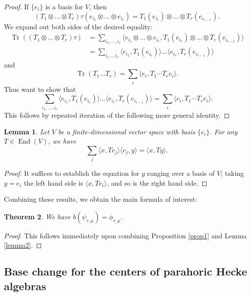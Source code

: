 \documentclass[reqno]{amsart}
\numberwithin{equation}{section}
\DeclareMathOperator{\Tr}{Tr}
\DeclareMathOperator{\End}{End}
\newtheorem{thm}{Theorem}[section]
\newtheorem{lemma}[thm]{Lemma}
\theoremstyle{remark}
\numberwithin{equation}{section}
\begin{document}
\begin{proof}
 If $\{e_i\}$ is a basis for $V$, then 
\[
(T_1 \otimes  \ldots \otimes T_r) \tau (e_{i_1}  \otimes \ldots \otimes e_{i_r}) = T_1(e_{i_r}) \otimes \ldots\otimes  T_r(e_{i_{r-1}}).
\]
We expand out both sides of the desired equality:  
\begin{align*}
\Tr( (T_1 \otimes  \ldots \otimes T_r) \tau )  &= \sum_{i_1, \ldots, i_r} \langle e_{i_1}\otimes \ldots \otimes e_{i_r}, T_1(e_{i_r}) \otimes \ldots \otimes T_r(e_{i_{r-1}} ) \rangle \\
&= \sum_{i_1 \ldots, i_r} \langle e_{i_1}, T_1(e_{i_r})  \rangle  \ldots \langle e_{i_r}, T_r(e_{i_{r-1}}) \rangle
\end{align*}
and 
\[
\Tr(T_1 \ldots T_r) = \sum_i \langle e_i, T_1 \cdots T_r e_i \rangle.
\]
Thus want to show that 
\[
\sum_{i_1, \ldots, i_r} \langle e_{i_1}, T_1(e_{i_r})  \rangle  \ldots \langle e_{i_r}, T_r(e_{i_{r-1}}) \rangle =  \sum_i \langle e_i, T_1 \cdots T_r e_i \rangle.
\]
This follows by repeated iteration of the following more general identity. 
\end{proof}

\begin{lemma}
Let $V$ be a finite-dimensional vector space with basis $\{e_i\}$. For any $T \in \End(V)$, we have 
\begin{equation}\label{general identity}
\sum_j \langle x, Te_j \rangle \langle e_j, y \rangle = \langle x, Ty \rangle.
\end{equation}
\end{lemma}

\begin{proof}
It suffices to establish the equation for $y$ ranging over a basis of $V$; taking $y=e_i$ the left hand side is $\langle x, Te_i\rangle$, and so is the right hand side. 
\end{proof}

Combining these results, we obtain the main formula of interest: 

\begin{thm}\label{spherical BC} 
We have $b(\psi_{r,\mu})  =\phi_{r, \mu}$.
\end{thm}


\begin{proof}
This follows immediately upon combining Proposition \ref{prop1} and Lemma \ref{lemma2}.
\end{proof}

\subsection{Base change for the centers of parahoric Hecke algebras} 
\end{document}
